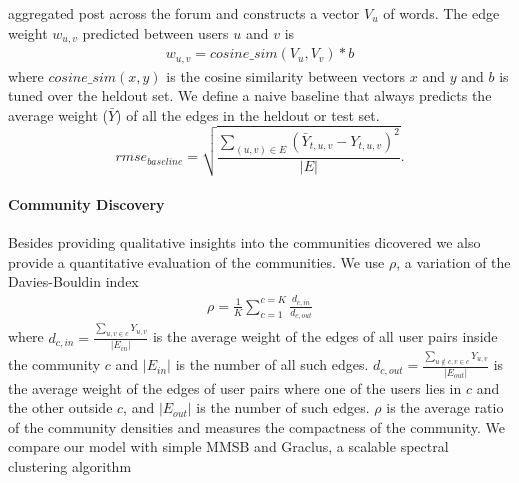 \documentclass{sig-alternate}
\begin{document}
aggregated post across the forum and constructs a vector $V_u$ of words. The 
edge weight $w_{u,v}$ predicted between users $u$ and $v$ is 
\vspace*{-0.5\baselineskip}
\small
\begin{align}
w_{u,v}=cosine\_sim(V_u,V_v)*b
\label{eqn:bow}
\end{align}
\normalsize
where $cosine\_sim(x,y)$ is the cosine similarity 
between vectors $x$ and $y$ and $b$ is tuned
over the heldout set. We define a naive baseline that
always predicts the average weight ($\bar{Y}$) of all the edges
in the heldout or test set.
\vspace*{-0.5\baselineskip}
\small
\begin{equation}
	rmse_{baseline}=\sqrt{\frac{\sum_{(u,v)\in E}(\bar{Y}_{t,u,v}-Y_{t,u,v})^2}{|E|}}.
\end{equation}
\normalsize

\vspace*{-0.5\baselineskip}
\paragraph{Community Discovery}
Besides providing qualitative insights into the communities dicovered
we also provide a quantitative evaluation of the communities. We use 
$\rho$, a variation of the Davies-Bouldin index~\cite{Davies:1979} 
\vspace*{-0.5\baselineskip}
\small
\begin{align}
	\rho=\frac{1}{K} \sum_{c=1}^{c=K}\frac{d_{c,in}}{d_{c,out}}
\end{align}
\normalsize
where $d_{c,in}=\frac{\sum_{u,v\in c}Y_{u,v}}{|E_{in}|}$ is the average weight of the 
edges of all user pairs inside the community $c$ and $|E_{in}|$ is the number of 
all such edges. $d_{c,out}=\frac{\sum_{u\notin c,v\in c}Y_{u,v}}{|E_{out}|}$ is the 
average weight of the edges of user pairs where one of the users lies in $c$ and the other 
outside $c$, and $|E_{out}|$ is the number of such edges. 
$\rho$ is the average ratio of the community densities and measures 
the compactness of the community.
We compare our model with simple MMSB and Graclus, a scalable spectral clustering
algorithm~\cite{Dhillon:2005}

\vspace*{-0.5\baselineskip}
\end{document}
